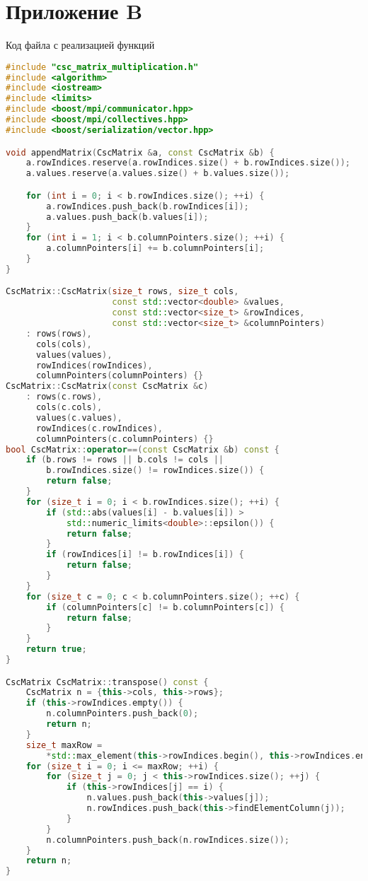 \documentclass[a4paper,12pt]{article}
\begin{document}
\section*{Приложение B}
Код файла с реализацией функций
\begin{lstlisting}[language=C++]
#include "csc_matrix_multiplication.h"
#include <algorithm>
#include <iostream>
#include <limits>
#include <boost/mpi/communicator.hpp>
#include <boost/mpi/collectives.hpp>
#include <boost/serialization/vector.hpp>

void appendMatrix(CscMatrix &a, const CscMatrix &b) {
    a.rowIndices.reserve(a.rowIndices.size() + b.rowIndices.size());
    a.values.reserve(a.values.size() + b.values.size());

    for (int i = 0; i < b.rowIndices.size(); ++i) {
        a.rowIndices.push_back(b.rowIndices[i]);
        a.values.push_back(b.values[i]);
    }
    for (int i = 1; i < b.columnPointers.size(); ++i) {
        a.columnPointers[i] += b.columnPointers[i];
    }
}

CscMatrix::CscMatrix(size_t rows, size_t cols,
                     const std::vector<double> &values,
                     const std::vector<size_t> &rowIndices,
                     const std::vector<size_t> &columnPointers)
    : rows(rows),
      cols(cols),
      values(values),
      rowIndices(rowIndices),
      columnPointers(columnPointers) {}
CscMatrix::CscMatrix(const CscMatrix &c)
    : rows(c.rows),
      cols(c.cols),
      values(c.values),
      rowIndices(c.rowIndices),
      columnPointers(c.columnPointers) {}
bool CscMatrix::operator==(const CscMatrix &b) const {
    if (b.rows != rows || b.cols != cols ||
        b.rowIndices.size() != rowIndices.size()) {
        return false;
    }
    for (size_t i = 0; i < b.rowIndices.size(); ++i) {
        if (std::abs(values[i] - b.values[i]) >
            std::numeric_limits<double>::epsilon()) {
            return false;
        }
        if (rowIndices[i] != b.rowIndices[i]) {
            return false;
        }
    }
    for (size_t c = 0; c < b.columnPointers.size(); ++c) {
        if (columnPointers[c] != b.columnPointers[c]) {
            return false;
        }
    }
    return true;
}

CscMatrix CscMatrix::transpose() const {
    CscMatrix n = {this->cols, this->rows};
    if (this->rowIndices.empty()) {
        n.columnPointers.push_back(0);
        return n;
    }
    size_t maxRow =
        *std::max_element(this->rowIndices.begin(), this->rowIndices.end());
    for (size_t i = 0; i <= maxRow; ++i) {
        for (size_t j = 0; j < this->rowIndices.size(); ++j) {
            if (this->rowIndices[j] == i) {
                n.values.push_back(this->values[j]);
                n.rowIndices.push_back(this->findElementColumn(j));
            }
        }
        n.columnPointers.push_back(n.rowIndices.size());
    }
    return n;
}


\end{lstlisting}
\end{document}

